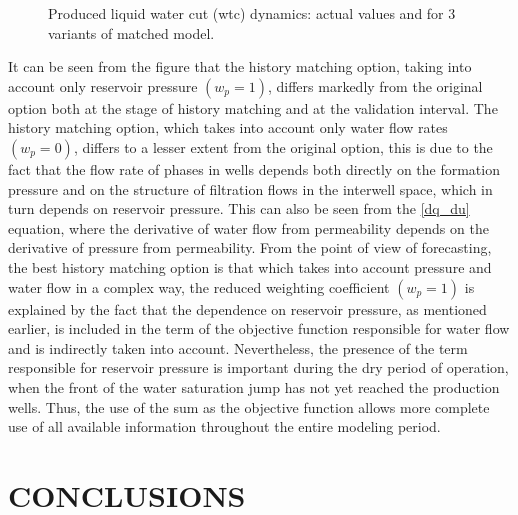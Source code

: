 \documentclass[
11pt,%
tightenlines,%
twoside,%
onecolumn,%
nofloats,%
nobibnotes,%
nofootinbib,%
superscriptaddress,%
noshowpacs,%
centertags]%
{revtex4}
\begin{document}
\begin{figure}
	\caption{Produced liquid water cut (wtc) dynamics: actual values and for 3 variants of matched model.}
	\label{fig:wtc}
\end{figure}
It can be seen from the figure that the history matching option, taking into account only reservoir pressure $(w_p=1)$, differs markedly from the original option both at the stage of history matching and at the validation interval. The history matching option, which takes into account only water flow rates $(w_p=0)$, differs to a lesser extent from the original option, this is due to the fact that the flow rate of phases in wells depends both directly on the formation pressure and on the structure of filtration flows in the interwell space, which in turn depends on reservoir pressure. This can also be seen from the \ref{dq_du} equation, where the derivative of water flow from permeability depends on the derivative of pressure from permeability. From the point of view of forecasting, the best history matching option is that which takes into account pressure and water flow in a complex way, the reduced weighting coefficient $(w_p=1)$ is explained by the fact that the dependence on reservoir pressure, as mentioned earlier, is included in the term of the objective function responsible for water flow and is indirectly taken into account. Nevertheless, the presence of the term responsible for reservoir pressure is important during the dry period of operation, when the front of the water saturation jump has not yet reached the production wells. Thus, the use of the sum as the objective function allows more complete use of all available information throughout the entire modeling period.

\section{CONCLUSIONS}
\end{document}
